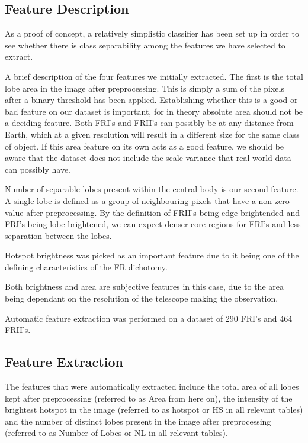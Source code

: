 \documentclass[conference]{IEEEtran}
\begin{document}
\subsection{Feature Description}

As a proof of concept, a relatively simplistic classifier has been set up in order to see whether there is class separability among the features we have selected to extract. 

A brief description of the four features we initially extracted. The first is the total lobe area in the image after preprocessing. This is simply a sum of the pixels after a binary threshold has been applied. Establishing whether this is a good or bad feature on our dataset is important, for in theory absolute area should not be a deciding feature. Both FRI's and FRII's can possibly be at any distance from Earth, which at a given resolution will result in a different size for the same class of object. If this area feature on its own acts as a good feature, we should be aware that the dataset does not include the scale variance that real world data can possibly have.

Number of separable lobes present within the central body is our second feature. A single lobe is defined as a group of neighbouring pixels that have a non-zero value after preprocessing. By the definition of FRII's being edge brightended and FRI's being lobe brightened, we can expect denser core regions for FRI's and less separation between the lobes.

Hotspot brightness was picked as an important feature due to it being one of the defining characteristics of the FR dichotomy.

Both brightness and area are subjective features in this case, due to the area being dependant on the resolution of the telescope making the observation.

Automatic feature extraction was performed on a dataset of 290 FRI's and 464 FRII's.

\subsection{Feature Extraction}

The features that were automatically extracted include the total area of all lobes kept after preprocessing (referred to as Area from here on), the intensity of the brightest hotspot in the image (referred to as hotspot or HS in all relevant tables) and the number of distinct lobes present in the image after preprocessing (referred to as Number of Lobes or NL in all relevant tables).
\end{document}

